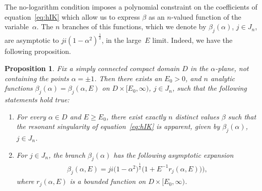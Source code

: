 \documentclass[pdftex]{sigma}
\numberwithin{equation}{section}
\newtheorem{pro}[thm]{Proposition}
\newcommand{\al}{\alpha}
\begin{document}
The no-logarithm condition imposes a polynomial constraint on the coef\/f\/icients of equation~\eqref{eq:hIK} which allow us to express $\beta$ as an $n$-valued function of the variable~$\al$. The $n$ branches of this functions, which we denote by $\beta_j(\al)$, $j \in J_n$, are asymptotic to $j i (1-\al^2)^{\frac12}$, in the large~$E$ limit. Indeed, we have the following proposition.
\begin{pro}\label{pro:apparent}
	Fix a simply connected compact domain $D$ in the $\al$-plane, not containing the points $\al=\pm1$. Then there exists an $E_0 >0$, and $n$ analytic functions $\beta_j(\al)=\beta_j(\al,E)$ on $D \times [E_0,\infty)$, $j\in J_n$, such that the following statements hold true:
	\begin{enumerate}\itemsep=0pt
		\item[$1.$] For every $\al\in D$ and $E\geq E_0$, there exist exactly $n$ distinct values $\beta$ such that the resonant singularity of equation~\eqref{eq:hIK} is apparent, given by $\beta_j(\al)$, $j \in J_n$.
		\item[$2.$] For $j \in J_n$, the branch $\beta_j(\al)$ has the following asymptotic expansion
		\begin{gather*}%
		\beta_j(\al,E)=j i \big(1-\al^2\big)^{\frac12} \big(1+E^{-1}r_j(\al,E))\big) ,
		\end{gather*}
		where $r_j(\al,E)$ is a bounded function on $D \times [E_0,\infty)$.
	\end{enumerate}
\end{pro}
\end{document}
